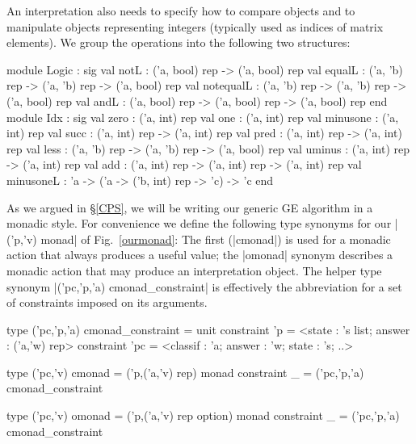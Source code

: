 \documentclass{elsart}
\begin{document}
An interpretation also needs to specify how to compare objects
and to manipulate objects representing integers (typically used as
indices of matrix elements). We group the operations into the
following two structures:
\begin{code}
module Logic : sig
  val notL      : ('a, bool) rep -> ('a, bool) rep
  val equalL    : ('a, 'b) rep   -> ('a, 'b) rep   -> ('a, bool) rep
  val notequalL : ('a, 'b) rep   -> ('a, 'b) rep   -> ('a, bool) rep
  val andL      : ('a, bool) rep -> ('a, bool) rep -> ('a, bool) rep
end
module Idx : sig
  val zero : ('a, int) rep
  val one  : ('a, int) rep
  val minusone : ('a, int) rep
  val succ : ('a, int) rep -> ('a, int) rep
  val pred : ('a, int) rep -> ('a, int) rep
  val less : ('a, 'b) rep  -> ('a, 'b) rep -> ('a, bool) rep
  val uminus : ('a, int) rep -> ('a, int) rep
  val add : ('a, int) rep   -> ('a, int) rep -> ('a, int) rep
  val minusoneL : 'a -> ('a -> ('b, int) rep -> 'c) -> 'c
end
\end{code}

As we argued in \S\ref{CPS}, we will be writing our generic GE
algorithm in a monadic style. For convenience we define the
following type synonyms for our |('p,'v) monad| of Fig.~\ref{ourmonad}: The
first (|cmonad|) is used for a monadic action that always produces a useful
value; the |omonad| synonym describes a monadic action that may
produce an interpretation object. The helper
type synonym |('pc,'p,'a) cmonad_constraint| is effectively the
abbreviation for a set of constraints imposed on its arguments.
\begin{code}
type ('pc,'p,'a) cmonad_constraint = unit
  constraint 'p = <state : 's list; answer : ('a,'w) rep>
  constraint 'pc = <classif : 'a; answer : 'w; state : 's; ..>

type ('pc,'v) cmonad = ('p,('a,'v) rep) monad
  constraint _ = ('pc,'p,'a) cmonad_constraint 

type ('pc,'v) omonad = ('p,('a,'v) rep option) monad
  constraint _ = ('pc,'p,'a) cmonad_constraint 
\end{code}
\end{document}
